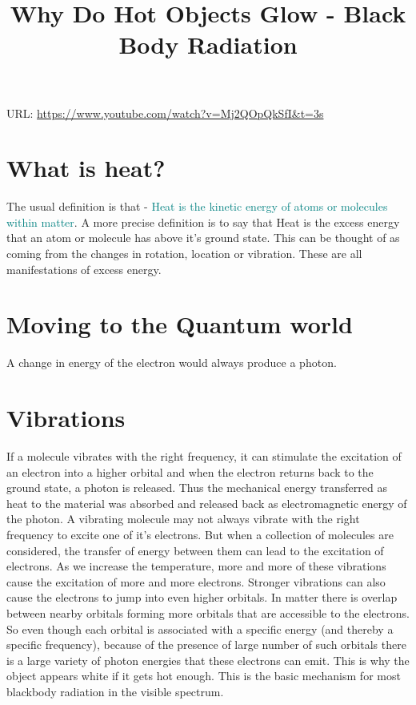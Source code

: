 \documentclass{../template/texnote}
\title{Why Do Hot Objects Glow - Black Body Radiation}
\begin{document}
    \maketitle {}

URL: \url{https://www.youtube.com/watch?v=Mj2QOpQkSfI&t=3s}
\section{What is heat?}
The usual definition is that - \textcolor{teal}{Heat is the kinetic energy of atoms or molecules within matter}.
A more precise definition is to say that Heat is the excess energy that an atom or molecule has above it's ground state.
This can be thought of as coming from the changes in rotation, location or vibration.
These are all manifestations of excess energy.
\section{Moving to the Quantum world}
A change in energy of the electron would always produce a photon.
\section{Vibrations}
If a molecule vibrates with the right frequency, it can stimulate the excitation of an electron into a higher orbital and when the electron returns back to the ground state, a photon is released.
Thus the mechanical energy transferred as heat to the material was absorbed and released back as electromagnetic energy of the photon.
A vibrating molecule may not always vibrate with the right frequency to excite one of it's electrons.
But when a collection of molecules are considered, the transfer of energy between them can lead to the excitation of electrons.
As we increase the temperature, more and more of these vibrations cause the excitation of more and more electrons.
Stronger vibrations can also cause the electrons to jump into even higher orbitals.
In matter there is overlap between nearby orbitals forming more orbitals that are accessible to the electrons.
So even though each orbital is associated with a specific energy (and thereby a specific frequency), because of the presence of large number of such orbitals there is a large variety of photon energies that these electrons can emit.
This is why the object appears white if it gets hot enough.
This is the basic mechanism for most blackbody radiation in the visible spectrum.
\end{document}
